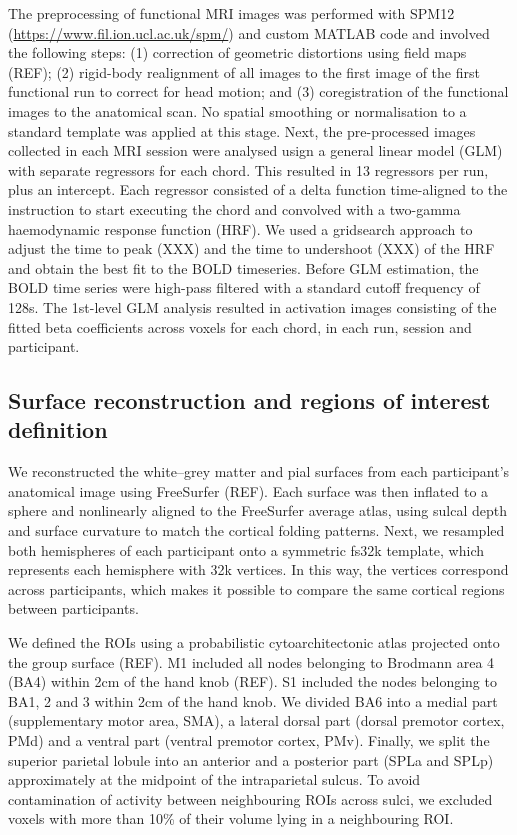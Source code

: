 \documentclass{article}
\begin{document}
The preprocessing of functional MRI images was performed with SPM12 (\url{https://www.fil.ion.ucl.ac.uk/spm/}) and custom MATLAB code and involved the following steps: (1) correction of geometric distortions using field maps (REF); (2) rigid-body realignment of all images to the first image of the first functional run to correct for head motion; and (3) coregistration of the functional images to the anatomical scan. No spatial smoothing or normalisation to a standard template was applied at this stage. Next, the pre-processed images collected in each MRI session were analysed usign a general linear model (GLM) with separate regressors for each chord. This resulted in 13 regressors per run, plus an intercept. Each regressor consisted of a delta function time-aligned to the instruction to start executing the chord and convolved with a two-gamma haemodynamic response function (HRF). We used a gridsearch approach to adjust the time to peak (XXX) and the time to undershoot (XXX) of the HRF and obtain the best fit to the BOLD timeseries. Before GLM estimation, the BOLD time series were high-pass filtered with a standard cutoff frequency of 128s. The 1st-level GLM analysis resulted in activation images consisting of the fitted beta coefficients across voxels for each chord, in each run, session and participant.

\subsection{Surface reconstruction and regions of interest definition}
 
We reconstructed the white–grey matter and pial surfaces from each participant's anatomical image using FreeSurfer (REF). Each surface was then inflated to a sphere and nonlinearly aligned to the FreeSurfer average atlas, using sulcal depth and surface curvature to match the cortical folding patterns. Next, we resampled both hemispheres of each participant onto a symmetric fs32k template, which represents each hemisphere with 32k vertices. In this way, the vertices correspond across participants, which makes it possible to compare the same cortical regions between participants.

We defined the ROIs using a probabilistic cytoarchitectonic atlas projected onto the group surface (REF). M1 included all nodes belonging to Brodmann area 4 (BA4) within 2cm of the hand knob (REF). S1 included the nodes belonging to BA1, 2 and 3 within 2cm of the hand knob. We divided BA6 into a medial part (supplementary motor area, SMA), a lateral dorsal part (dorsal premotor cortex, PMd) and a ventral part (ventral premotor cortex, PMv). Finally, we split the superior parietal lobule into an anterior and a posterior part (SPLa and SPLp) approximately at the midpoint of the intraparietal sulcus. To avoid contamination of activity between neighbouring ROIs across sulci, we excluded voxels with more than 10\% of their volume lying in a neighbouring ROI.
\end{document}

